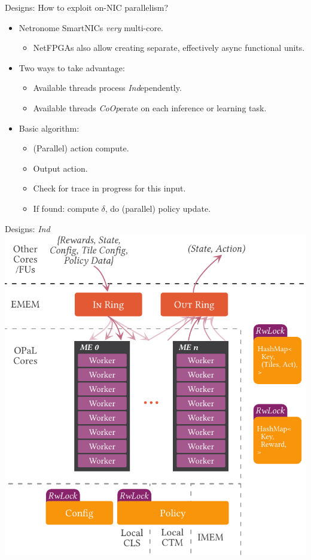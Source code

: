 \documentclass[aspectratio=169,xcolor={dvipsnames}
,handout
]{beamer}
\newcommand{\Coopfw}{\emph{CoOp}}
\newcommand{\Indfw}{\emph{Ind}}
\begin{document}
\begin{frame}{Designs: How to exploit on-NIC parallelism?}
	\begin{itemize}[<+->]
		\item Netronome SmartNICs \emph{very} multi-core.
		\begin{itemize}[<+->]
			\item NetFPGAs also allow creating separate, effectively async functional units.
		\end{itemize}
		\item Two ways to take advantage:
		\begin{itemize}[<+->]
			\item Available threads process \Indfw{}ependently.
			\item Available threads \Coopfw{}erate on each inference or learning task.
		\end{itemize}
		\item Basic algorithm:
		\begin{itemize}[<+->]
			\item (Parallel) action compute.
			\item Output action.
			\item Check for trace in progress for this input.
			\item If found: compute $\delta$, do (parallel) policy update.
		\end{itemize}
	\end{itemize}
\end{frame}

\begin{frame}{Designs: \emph{Ind}}
	\centering
	\includegraphics[width=0.52\linewidth]{../paper/figures/ind}
\end{frame}
\end{document}
